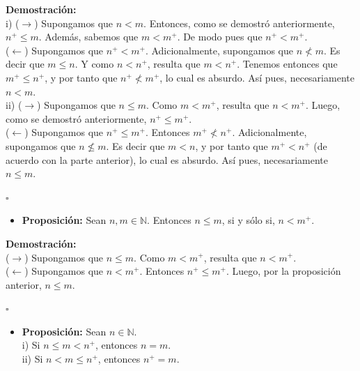 \documentclass[10 pt]{article}
\begin{document}
\Large{\textbf{Demostración:} \\

i) ($\rightarrow$) Supongamos que $n<m$. Entonces, como se demostró anteriormente, $n^+ \leq m$. Además, sabemos que $m<m^+$. De modo pues que $n^+<m^+$. \\

($\leftarrow$) Supongamos que $n^+<m^+$. Adicionalmente, supongamos que $n \nless m$. Es decir que $m \leq n$. Y como $n<n^+$, resulta que $m<n^+$. Tenemos entonces que $m^+ \leq n^+$, y por tanto que $n^+ \nless m^+$, lo cual es absurdo. Así pues, necesariamente $n<m$. \\

ii) ($\rightarrow$) Supongamos que $n \leq m$. Como $m<m^+$, resulta que $n<m^+$. Luego, como se demostró anteriormente, $n^+ \leq m^+$. \\

($\leftarrow$) Supongamos que $n^+ \leq m^+$. Entonces $m^+ \nless n^+$. Adicionalmente, supongamos que $n \nleq m$. Es decir que $m<n$, y por tanto que $m^+<n^+$ (de acuerdo con la parte anterior), lo cual es absurdo. Así pues, necesariamente $n \leq m$.} \\

\begin{flushright}
    $\square$
\end{flushright}

\begin{itemize}
    \item \Large{\textbf{Proposición:} Sean $n,m \in \mathbb N$. Entonces $n \leq m$, si y sólo si, $n<m^+$.} \\
\end{itemize}

\Large{\textbf{Demostración:} \\

($\rightarrow$) Supongamos que $n \leq m$. Como $m<m^+$, resulta que $n<m^+$. \\

($\leftarrow$) Supongamos que $n<m^+$. Entonces $n^+ \leq m^+$. Luego, por la proposición anterior, $n \leq m$.} \\

\begin{flushright}
    $\square$
\end{flushright}

\begin{itemize}
    \item \Large{\textbf{Proposición:} Sean $n \in \mathbb N$. \\
    
    i) Si $n \leq m<n^+$, entonces $n=m$. \\

    ii) Si $n<m \leq n^+$, entonces $n^+=m$.} \\
\end{itemize}
\end{document}
